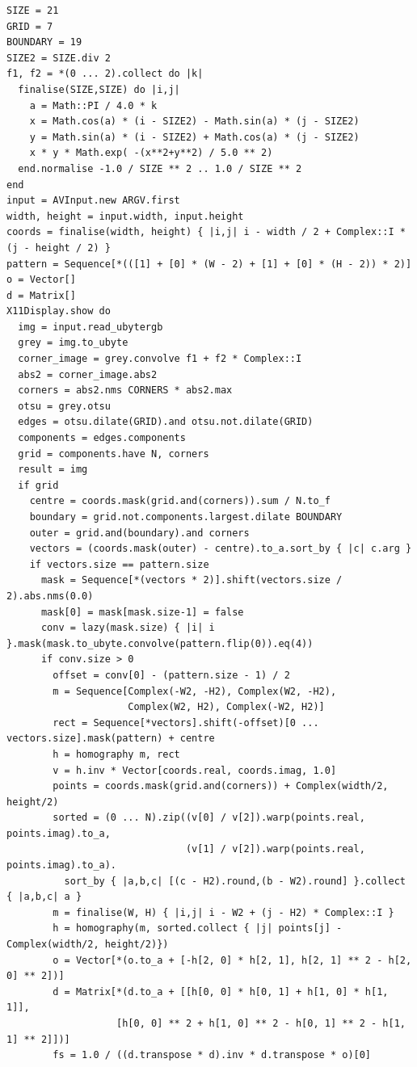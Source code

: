 \documentclass[12pt,a4paper,oneside,openright]{book}
\begin{document}
\begin{CJK}{UTF8}{}
\begin{lstlisting}
SIZE = 21
GRID = 7
BOUNDARY = 19
SIZE2 = SIZE.div 2
f1, f2 = *(0 ... 2).collect do |k|
  finalise(SIZE,SIZE) do |i,j|
    a = Math::PI / 4.0 * k
    x = Math.cos(a) * (i - SIZE2) - Math.sin(a) * (j - SIZE2)
    y = Math.sin(a) * (i - SIZE2) + Math.cos(a) * (j - SIZE2)
    x * y * Math.exp( -(x**2+y**2) / 5.0 ** 2)
  end.normalise -1.0 / SIZE ** 2 .. 1.0 / SIZE ** 2
end
input = AVInput.new ARGV.first
width, height = input.width, input.height
coords = finalise(width, height) { |i,j| i - width / 2 + Complex::I * (j - height / 2) }
pattern = Sequence[*(([1] + [0] * (W - 2) + [1] + [0] * (H - 2)) * 2)]
o = Vector[]
d = Matrix[]
X11Display.show do
  img = input.read_ubytergb
  grey = img.to_ubyte
  corner_image = grey.convolve f1 + f2 * Complex::I
  abs2 = corner_image.abs2
  corners = abs2.nms CORNERS * abs2.max
  otsu = grey.otsu
  edges = otsu.dilate(GRID).and otsu.not.dilate(GRID)
  components = edges.components
  grid = components.have N, corners
  result = img
  if grid
    centre = coords.mask(grid.and(corners)).sum / N.to_f
    boundary = grid.not.components.largest.dilate BOUNDARY
    outer = grid.and(boundary).and corners
    vectors = (coords.mask(outer) - centre).to_a.sort_by { |c| c.arg }
    if vectors.size == pattern.size
      mask = Sequence[*(vectors * 2)].shift(vectors.size / 2).abs.nms(0.0)
      mask[0] = mask[mask.size-1] = false
      conv = lazy(mask.size) { |i| i }.mask(mask.to_ubyte.convolve(pattern.flip(0)).eq(4))
      if conv.size > 0
        offset = conv[0] - (pattern.size - 1) / 2
        m = Sequence[Complex(-W2, -H2), Complex(W2, -H2),
                     Complex(W2, H2), Complex(-W2, H2)]
        rect = Sequence[*vectors].shift(-offset)[0 ... vectors.size].mask(pattern) + centre
        h = homography m, rect
        v = h.inv * Vector[coords.real, coords.imag, 1.0]
        points = coords.mask(grid.and(corners)) + Complex(width/2, height/2)
        sorted = (0 ... N).zip((v[0] / v[2]).warp(points.real, points.imag).to_a,
                               (v[1] / v[2]).warp(points.real, points.imag).to_a).
          sort_by { |a,b,c| [(c - H2).round,(b - W2).round] }.collect { |a,b,c| a }
        m = finalise(W, H) { |i,j| i - W2 + (j - H2) * Complex::I }
        h = homography(m, sorted.collect { |j| points[j] - Complex(width/2, height/2)})
        o = Vector[*(o.to_a + [-h[2, 0] * h[2, 1], h[2, 1] ** 2 - h[2, 0] ** 2])]
        d = Matrix[*(d.to_a + [[h[0, 0] * h[0, 1] + h[1, 0] * h[1, 1]],
                   [h[0, 0] ** 2 + h[1, 0] ** 2 - h[0, 1] ** 2 - h[1, 1] ** 2]])]
        fs = 1.0 / ((d.transpose * d).inv * d.transpose * o)[0]

\end{lstlisting}
\end{CJK}
\end{document}
